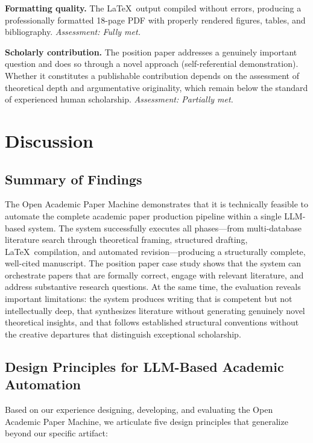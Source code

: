 \documentclass{article}
\begin{document}
\textbf{Formatting quality.} The \LaTeX\ output compiled without errors, producing a professionally formatted 18-page PDF with properly rendered figures, tables, and bibliography. \emph{Assessment: Fully met.}

\textbf{Scholarly contribution.} The position paper addresses a genuinely important question and does so through a novel approach (self-referential demonstration). Whether it constitutes a publishable contribution depends on the assessment of theoretical depth and argumentative originality, which remain below the standard of experienced human scholarship. \emph{Assessment: Partially met.}


\section{Discussion}

\subsection{Summary of Findings}

The Open Academic Paper Machine demonstrates that it is technically feasible to automate the complete academic paper production pipeline within a single LLM-based system. The system successfully executes all phases---from multi-database literature search through theoretical framing, structured drafting, \LaTeX\ compilation, and automated revision---producing a structurally complete, well-cited manuscript. The position paper case study \citep{blask2026creator} shows that the system can orchestrate papers that are formally correct, engage with relevant literature, and address substantive research questions. At the same time, the evaluation reveals important limitations: the system produces writing that is competent but not intellectually deep, that synthesizes literature without generating genuinely novel theoretical insights, and that follows established structural conventions without the creative departures that distinguish exceptional scholarship.

\subsection{Design Principles for LLM-Based Academic Automation}

Based on our experience designing, developing, and evaluating the Open Academic Paper Machine, we articulate five design principles that generalize beyond our specific artifact:
\end{document}
